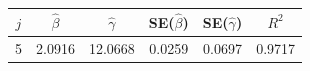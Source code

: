 \begin{tabular}{cccccc}
\toprule
$j$ & $\hat{\beta}$ & $\hat{\gamma}$ & SE($\hat{\beta}$) & SE($\hat{\gamma}$) & $R^2$ \\
\midrule
5 & 2.0916 & 12.0668 & 0.0259 & 0.0697 & 0.9717 \\
\bottomrule
\end{tabular}